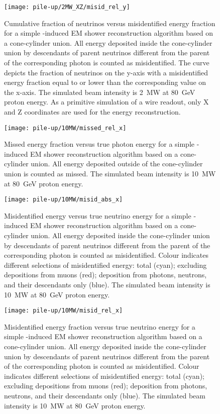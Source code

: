 \begin{figure}[htb]
	\centering
	\texttt{[image: pile-up/2MW\_XZ/misid\_rel\_y]}
	\caption{Cumulative fraction of neutrinos versus misidentified energy fraction for a simple \Pgpz-induced EM shower reconstruction algorithm based on a cone-cylinder union.
		All energy deposited inside the cone-cylinder union by descendants of parent neutrinos different from the parent of the corresponding \Pgpz photon is counted as misidentified.
		The curve depicts the fraction of neutrinos on the y-axis with a misidentified energy fraction equal to or lower than the corresponding value on the x-axis.
		The simulated beam intensity is \SI{2}{\mega\watt} at \SI{80}{\giga\electronvolt} proton energy.
		As a primitive simulation of a wire readout, only X and Z coordinates are used for the energy reconstruction.}
	\label{fig:dune-nd_2MW-XZ_misid-rel-y}
\end{figure}

\begin{figure}[htb]
	\centering
	\texttt{[image: pile-up/10MW/missed\_rel\_x]}
	\caption{Missed energy fraction versus true photon energy for a simple \Pgpz-induced EM shower reconstruction algorithm based on a cone-cylinder union.
		All energy deposited outside of the cone-cylinder union is counted as missed.
		The simulated beam intensity is \SI{10}{\mega\watt} at \SI{80}{\giga\electronvolt} proton energy.}
	\label{fig:dune-nd_10MW_missed-rel-x}
\end{figure}

\begin{figure}[htb]
	\centering
	\texttt{[image: pile-up/10MW/misid\_abs\_x]}
	\caption{Misidentified energy versus true neutrino energy for a simple \Pgpz-induced EM shower reconstruction algorithm based on a cone-cylinder union.
		All energy deposited inside the cone-cylinder union by descendants of parent neutrinos different from the parent of the corresponding \Pgpz photon is counted as misidentified.
		Colour indicates different selections of misidentified energy: total (cyan); excluding depositions from muons (red); deposition from photons, neutrons, and their descendants only (blue).
		The simulated beam intensity is \SI{10}{\mega\watt} at \SI{80}{\giga\electronvolt} proton energy.}
	\label{fig:dune-nd_10MW_misid-abs-x}
\end{figure}

\begin{figure}[htb]
	\centering
	\texttt{[image: pile-up/10MW/misid\_rel\_x]}
	\caption{Misidentified energy fraction versus true neutrino energy for a simple \Pgpz-induced EM shower reconstruction algorithm based on a cone-cylinder union.
		All energy deposited inside the cone-cylinder union by descendants of parent neutrinos different from the parent of the corresponding \Pgpz photon is counted as misidentified.
		Colour indicates different selections of misidentified energy: total (cyan); excluding depositions from muons (red); deposition from photons, neutrons, and their descendants only (blue).
		The simulated beam intensity is \SI{10}{\mega\watt} at \SI{80}{\giga\electronvolt} proton energy.}
	\label{fig:dune-nd_10MW_misid-rel-x}
\end{figure}


